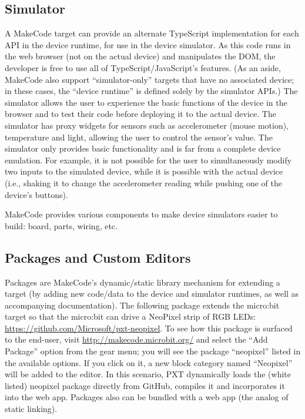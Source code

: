 \subsection{Simulator}

A MakeCode target can provide an alternate TypeScript implementation for each API in the device runtime, for use in the device
simulator. As this code runs in the web browser (not on the actual device) and manipulates the DOM, the developer is free to
use all of TypeScript/JavaScript's features. (As an aside, MakeCode also support ``simulator-only'' targets that have no 
associated device; in these cases, the ``device runtime'' is defined solely by the simulator APIs.) 
The simulator allows the user to experience the basic functions of the device in the browser and to test their code
before deploying it to the actual device. The simulator has proxy widgets for sensors such as accelerometer (mouse motion),
temperature and light, allowing the user to control the sensor's value.  The simulator only provides basic functionality
and is far from a complete device emulation.   For example, it is not possible for the user to simultaneously modify two
inputs to the simulated device, while it is possible with the actual device (i.e., shaking it to change the accelerometer
reading while pushing one of the device's buttons).

MakeCode provides various components to make device simulators easier to build: board, parts, wiring, etc.

\subsection{Packages and Custom Editors}

Packages are MakeCode's dynamic/static library mechanism for extending a target (by adding new code/data to the device
and simulator runtimes, as well as accompanying documentation). The following package extends the micro:bit target so
that the micro:bit can drive a NeoPixel strip of RGB LEDs: \url{https://github.com/Microsoft/pxt-neopixel}. To see how this
package is surfaced to the end-user, visit \url{http://makecode.microbit.org/} and select the ``Add Package'' option from the
gear menu; you will see the package ``neopixel'' listed in the available options. If you click on it, a new block category
named ``Neopixel'' will be added to the editor. In this scenario, PXT dynamically loads the (white listed) neopixel 
package directly from GitHub, compiles it and incorporates it into the web app. Packages also can be bundled with a web
app (the analog of static linking).  


